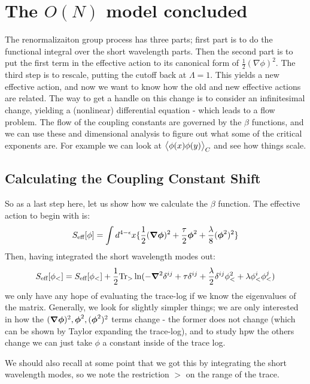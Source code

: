 \section{The $O(N)$ model concluded}
The renormalizaiton group process has three parts; first part is to do the functional integral over the short wavelength parts. Then the second part is to put the first term in the effective action to its canonical form of $\frac{1}{2}(\nabla \phi)^2$. The third step is to rescale, putting the cutoff back at $\Lambda = 1$. This yields a new effective action, and now we want to know how the old and new effective actions are related. The way to get a handle on this change is to consider an infinitesimal change, yielding a (nonlinear) differential equation - which leads to a flow problem. The flow of the coupling constants are governed by the $\beta$ functions, and we can use these and dimensional analysis to figure out what some of the critical exponents are. For example we can look at $\avg{\phi(x)\phi(y)}_C$ and see how things scale.

\subsection{Calculating the Coupling Constant Shift}
So as a last step here, let us show how we calculate the $\beta$ function. The effective action to begin with is:
\begin{equation}
    S_{\text{eff}}[\phi] = \int d^{4-\e}x \{\frac{1}{2}(\nabla \gv{\phi})^2 + \frac{\tau}{2}\gv{\phi}^2 + \frac{\lambda}{8}(\gv{\phi}^2)^2\}
\end{equation}
Then, having integrated the short wavelength modes out:
\begin{equation}
    S_{\text{eff}}[\phi_<] = S_{\text{eff}}[\phi_<] + \frac{1}{2}\Tr_>\ln(-\nabla^2\delta^{ij} + \tau\delta^{ij} + \frac{\lambda}{2}\delta^{ij}\phi_<^2 + \lambda \phi_<^i\phi_<^j )
\end{equation}
we only have any hope of evaluating the trace-log if we know the eigenvalues of the matrix. Generally, we look for slightly simpler things; we are only interested in how the $(\nabla \gv{\phi})^2, \gv{\phi}^2, (\gv{\phi}^2)^2$ terms change - the former does not change (which can be shown by Taylor expanding the trace-log), and to study hpw the others change we can just take $\phi$ a constant inside of the trace log.

We should also recall at some point that we got this by integrating the short wavelength modes, so we note the restriction $>$ on the range of the trace. 

